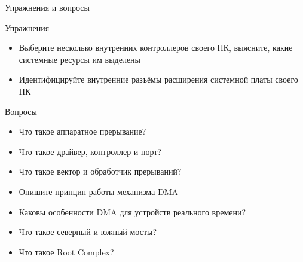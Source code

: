 \documentclass[xetex,aspectratio=43]{beamer}
\begin{document}
\begin{frame}{Упражнения и вопросы}
	\begin{block}{Упражнения}
		\begin{itemize}
			\tightlist
			\item
			Выберите несколько внутренних контроллеров своего ПК, выясните, какие
			системные ресурсы им выделены
            \item
            Идентифицируйте внутренние разъёмы расширения системной платы своего ПК
		\end{itemize}
	\end{block}

	\begin{block}{Вопросы}
		\begin{itemize}
			\tightlist
			\item
			Что такое аппаратное прерывание?
			\item
			Что такое драйвер, контроллер и порт?
			\item
			Что такое вектор и обработчик прерываний?
			\item
			Опишите принцип работы механизма DMA
			\item
			Каковы особенности DMA для устройств реального времени?
            \item
            Что такое северный и южный мосты?
            \item
            Что такое Root Complex?
		\end{itemize}
	\end{block}
\end{frame}

\postamble
\end{document}
